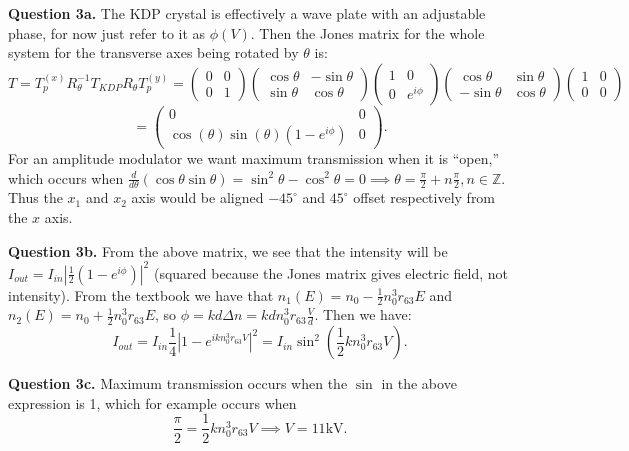 \documentclass[letterpaper, reqno,11pt]{article}
\begin{document}
{\medskip\noindent\bf Question 3a.} The KDP crystal is effectively a wave plate with an adjustable phase, for now just refer to it as $\phi(V)$. Then the Jones matrix for the whole system for the transverse axes being rotated by $\theta$ is:
\[
    T=T_p^{(x)} R_{\theta}^{-1}T_{KDP}R_{\theta} T_{p}^{(y)}= \begin{pmatrix} 0&0\\0&1 \end{pmatrix}\begin{pmatrix} \cos\theta&-\sin\theta\\\sin\theta&\cos\theta \end{pmatrix}\begin{pmatrix} 1&0\\0&e^{i\phi} \end{pmatrix} \begin{pmatrix} \cos\theta&\sin\theta\\-\sin\theta&\cos\theta \end{pmatrix}  \begin{pmatrix} 1&0\\0&0 \end{pmatrix} 
\]
\[
=\begin{pmatrix} 0 & 0 \\ \cos(\theta)\sin(\theta)(1 - e^{i\phi}) & 0 \end{pmatrix} 
.\]
For an amplitude modulator we want maximum transmission when it is ``open,'' which occurs when $\frac{d}{d\theta}\left( \cos\theta\sin\theta \right)=\sin^2\theta-\cos^2\theta=0 \implies \theta=\frac{\pi}{2}+n \frac{\pi}{2}, n\in \mathbb{Z}$. Thus the $x_1$ and $x_2$ axis would be aligned $-45^{\circ}$ and $45^{\circ}$ offset respectively from the $x$ axis.

{\medskip\noindent\bf Question 3b.} From the above matrix, we see that the intensity will be $I_{out}=I_{in}\left| \frac{1}{2}\left( 1-e^{i\phi} \right) \right| ^2$ (squared because the Jones matrix gives electric field, not intensity). From the textbook we have that $n_1(E)=n_0 - \frac{1}{2}n_{0}^3r_{63}E$ and $n_2(E)=n_0 + \frac{1}{2}n_{0}^3r_{63}E$, so $\phi=kd\Delta n=kdn_0^3r_{63} \frac{V}{d}$. Then we have:
\[
I_{out}=I_{in} \frac{1}{4}\left| 1-e^{ikn_{0}^3r_{63}V}\right|^2=I_{in}\sin^2\left( \frac{1}{2}kn_0^3r_{63}V \right) 
.\]

{\medskip\noindent\bf Question 3c.} Maximum transmission occurs when the $\sin$ in the above expression is 1, which for example occurs when
\[
\frac{\pi}{2}= \frac{1}{2}kn_0^3r_{63}V\implies V=11\text{kV}
.\]
\end{document}

